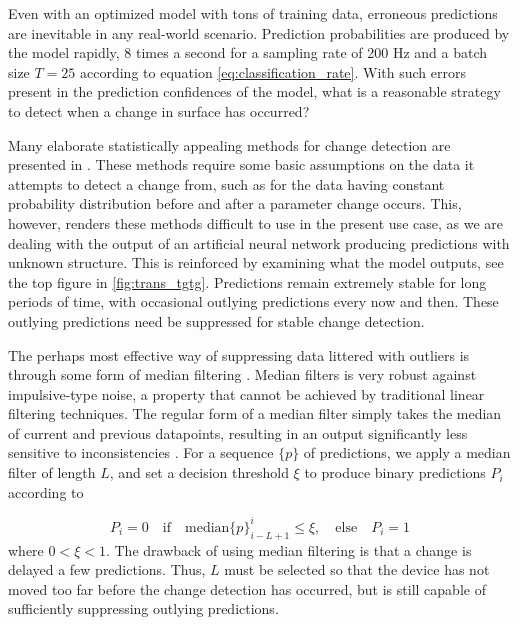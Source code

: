 \label{surface_change}
Even with an optimized model with tons of training data, erroneous predictions are inevitable in any real-world scenario. Prediction probabilities are produced by the model rapidly, 8 times a second for a sampling rate of 200 Hz and a batch size $T=25$ according to equation \ref{eq:classification_rate}. With such errors present in the prediction confidences of the model, what is a reasonable strategy to detect when a change in surface has occurred?  

Many elaborate statistically appealing methods for change detection are presented in \citep{basseville_nikiforov_1993}. These methods require some basic assumptions on the data it attempts to detect a change from, such as for the data having constant probability distribution before and after a parameter change occurs. This, however, renders these methods difficult to use in the present use case, as we are dealing with the output of an artificial neural network producing predictions with unknown structure. This is reinforced by examining what the model outputs, see the top figure in \ref{fig:trans_tgtg}. Predictions remain extremely stable for long periods of time, with occasional outlying predictions every now and then. These outlying predictions need be suppressed for stable change detection.

The perhaps most effective way of suppressing data littered with outliers is through some form of median filtering \citep{yin_yang_gabbouj_neuvo_1996}. Median filters is very robust against impulsive-type noise, a property that cannot be achieved by traditional linear filtering techniques. The regular form of a median filter simply takes the median of current and previous datapoints, resulting in an output significantly less sensitive to inconsistencies \citep{pearson_2002}. For a sequence $\{p\}$ of predictions, we apply a median filter of length $L$, and set a decision threshold $\xi$ to produce binary predictions $P_i$ according to
\citep{yin_yang_gabbouj_neuvo_1996}

\begin{equation}
	P_i=0 \quad\text{if}\quad\text{median}\{p\}_{i-L+1}^i\leq\xi, 
	\quad \text{else} \quad P_i = 1
\end{equation}
where $0<\xi<1$. The drawback of using median filtering is that a change is delayed a few predictions. Thus, $L$ must be selected so that the device has not moved too far before the change detection has occurred, but is still capable of sufficiently  suppressing outlying predictions. 



